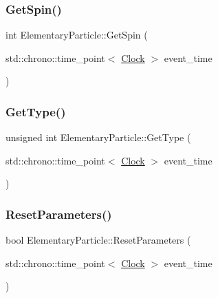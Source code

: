 \mbox{\label{classElementaryParticle_ad5f5a05770f94f4c8fee418d59098126}} 
\subsubsection{\texorpdfstring{Get\+Spin()}{GetSpin()}}
{\footnotesize\ttfamily int Elementary\+Particle\+::\+Get\+Spin (\begin{DoxyParamCaption}\item[{std\+::chrono\+::time\+\_\+point$<$ \mbox{\hyperlink{universe_8h_a0ef8d951d1ca5ab3cfaf7ab4c7a6fd80}{Clock}} $>$}]{event\+\_\+time }\end{DoxyParamCaption})\hspace{0.3cm}{\ttfamily [inline]}}

\mbox{\label{classElementaryParticle_a63fe7df86d2fba4a64a69dfa5757e94e}} 
\subsubsection{\texorpdfstring{Get\+Type()}{GetType()}}
{\footnotesize\ttfamily unsigned int Elementary\+Particle\+::\+Get\+Type (\begin{DoxyParamCaption}\item[{std\+::chrono\+::time\+\_\+point$<$ \mbox{\hyperlink{universe_8h_a0ef8d951d1ca5ab3cfaf7ab4c7a6fd80}{Clock}} $>$}]{event\+\_\+time }\end{DoxyParamCaption})\hspace{0.3cm}{\ttfamily [inline]}}

\mbox{\label{classElementaryParticle_ac0f85f34bdfc1d42324201eb7c38e85e}} 
\subsubsection{\texorpdfstring{Reset\+Parameters()}{ResetParameters()}}
{\footnotesize\ttfamily bool Elementary\+Particle\+::\+Reset\+Parameters (\begin{DoxyParamCaption}\item[{std\+::chrono\+::time\+\_\+point$<$ \mbox{\hyperlink{universe_8h_a0ef8d951d1ca5ab3cfaf7ab4c7a6fd80}{Clock}} $>$}]{event\+\_\+time }\end{DoxyParamCaption})}

